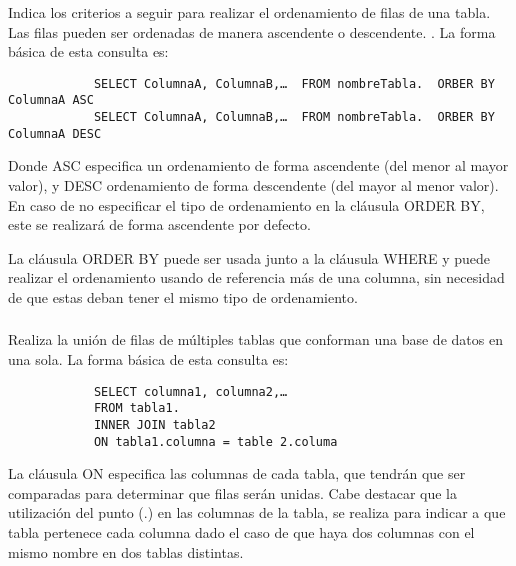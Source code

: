 \documentclass[10pt,a4paper]{article} %
\begin{document}
	\subsubsection{\color{colorESCOM}{Clausula ORDER BY}}
	{\large Indica los criterios a seguir para realizar el ordenamiento de filas de una tabla. Las filas pueden ser ordenadas de manera ascendente o descendente. . La forma b{\' a}sica de esta consulta es:
		
		\begin{lstlisting}
			SELECT ColumnaA, ColumnaB,…  FROM nombreTabla.  ORBER BY ColumnaA ASC
			SELECT ColumnaA, ColumnaB,…  FROM nombreTabla.  ORBER BY ColumnaA DESC
		\end{lstlisting}
		
		Donde ASC especifica un ordenamiento de forma ascendente (del menor al mayor valor), y DESC ordenamiento de forma descendente (del mayor al menor valor). En caso de no especificar el tipo de ordenamiento en la cl{\' a}usula ORDER BY, este se realizar{\' a} de forma ascendente por defecto. 
		
		
		\vspace{0.5cm}
		La cl{\' a}usula ORDER BY puede ser usada junto a la cl{\' a}usula WHERE y puede realizar el ordenamiento usando de referencia m{\' a}s de una columna, sin necesidad de que estas deban tener el mismo tipo de ordenamiento.}
	
	\subsubsection{\color{colorESCOM}{Clausula INNER JOIN}}
	{\large Realiza la uni{\' o}n de filas de m{\' u}ltiples tablas que conforman una base de datos en una sola. La forma b{\' a}sica de esta consulta es:
		
		\begin{lstlisting}
			SELECT columna1, columna2,…
			FROM tabla1.
			INNER JOIN tabla2
			ON tabla1.columna = table 2.columa
		\end{lstlisting}
		
		La cl{\' a}usula ON especifica las columnas de cada tabla, que tendr{\' a}n que ser comparadas para determinar que filas ser{\' a}n unidas. Cabe destacar que la utilizaci{\' o}n del punto (.) en las columnas de la tabla, se realiza para indicar a que tabla pertenece cada columna dado el caso de que haya dos columnas con el mismo nombre en dos tablas distintas.}
	
\end{document}
